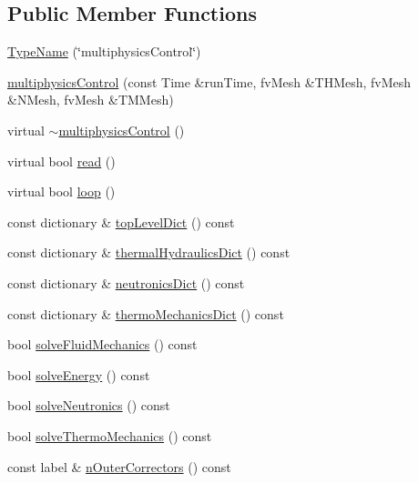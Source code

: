 \subsection*{Public Member Functions}
\begin{DoxyCompactItemize}
\item 
\hyperlink{classFoam_1_1multiphysicsControl_a1a21dba53591e4ac438c136ff08431d4}{Type\+Name} (\char`\"{}multiphysics\+Control\char`\"{})
\item 
\hyperlink{classFoam_1_1multiphysicsControl_a516f632110c1526d2feb7ad4aa5f96cb}{multiphysics\+Control} (const Time \&run\+Time, fv\+Mesh \&T\+H\+Mesh, fv\+Mesh \&N\+Mesh, fv\+Mesh \&T\+M\+Mesh)
\item 
virtual \hyperlink{classFoam_1_1multiphysicsControl_a7729ac49402cd44d8c563bd7768f8c23}{$\sim$multiphysics\+Control} ()
\item 
virtual bool \hyperlink{classFoam_1_1multiphysicsControl_af816873151ddb0126e98bb2f914d8ed5}{read} ()
\item 
virtual bool \hyperlink{classFoam_1_1multiphysicsControl_adf77b77054c2d4c23b70556fe767f23e}{loop} ()
\item 
const dictionary \& \hyperlink{classFoam_1_1multiphysicsControl_a231c754952bbec07457ea05c03ec91f6}{top\+Level\+Dict} () const
\item 
const dictionary \& \hyperlink{classFoam_1_1multiphysicsControl_a40f6fcba572beb5e5daffe1559a07e7c}{thermal\+Hydraulics\+Dict} () const
\item 
const dictionary \& \hyperlink{classFoam_1_1multiphysicsControl_aacdb5e3c6cd56ce91a7baadfcb8bc061}{neutronics\+Dict} () const
\item 
const dictionary \& \hyperlink{classFoam_1_1multiphysicsControl_a5a7a64bf607870c94d234581444f1102}{thermo\+Mechanics\+Dict} () const
\item 
bool \hyperlink{classFoam_1_1multiphysicsControl_a7673cb2daf7aa992cc1c55e4f37b7d36}{solve\+Fluid\+Mechanics} () const
\item 
bool \hyperlink{classFoam_1_1multiphysicsControl_ad8fff023499dda7fdbd2c81a31861e0e}{solve\+Energy} () const
\item 
bool \hyperlink{classFoam_1_1multiphysicsControl_ac6145d491fb669957dc010cd38ebcc35}{solve\+Neutronics} () const
\item 
bool \hyperlink{classFoam_1_1multiphysicsControl_a1802a25723969278d0a1dd57abbc1611}{solve\+Thermo\+Mechanics} () const
\item 
const label \& \hyperlink{classFoam_1_1multiphysicsControl_a5247e4528d54b1fd494777b5e8b5f0c8}{n\+Outer\+Correctors} () const

\end{DoxyCompactItemize}
